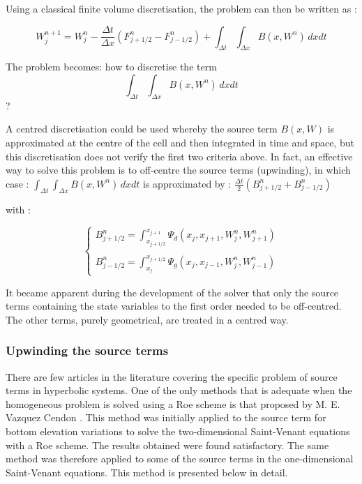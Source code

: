 Using a classical finite volume discretisation, the problem can then be written as :

\begin{equation}
 W_{j}^{n+1} = W_{j}^n - \frac{\Delta t}{\Delta x}(F_{j+1/2}^n - F_{j-1/2}^n) + \int_{\Delta t} \int_{\Delta x} B(x,W^n) \,dxdt
\end{equation}

The problem becomes: how to discretise the term
\begin{equation}
 \int_{\Delta t} \int_{\Delta x} B(x,W^n) \,dxdt \nonumber
\end{equation}
?

A centred discretisation could be used whereby the source term $B(x,W)$ is approximated at the centre of the cell and then integrated in time and space, but this discretisation does not verify the first two criteria above. In fact, an effective way to solve this problem is to off-centre the source terms (upwinding), in which case :
$\int_{\Delta t} \int_{\Delta x} B(x,W^n) \,dxdt$ is approximated by : $\frac{\Delta t}{2}(B_{j+1/2}^n + B_{j-1/2}^n)$

with :

\begin{equation}
 \left \lbrace
  \begin{array}{l}
    B_{j+1/2}^n = \int_{x_{j+1/2}}^{x_{j+1}} \Psi_d (x_j , x_{j+1} , W_{j}^n , W_{j+1}^n ) \\
    \\
    B_{j-1/2}^n = \int_{x_{j}}^{x_{j+1/2}} \Psi_g (x_j , x_{j-1} , W_{j}^n , W_{j-1}^n )
  \end{array}
 \right.
\end{equation}

It became apparent during the development of the solver that only the source terms containing the state variables to the first order needed to be off-centred. The other terms, purely geometrical, are treated in a centred way.

\subsubsection{Upwinding the source terms} \label{DecenSRC}

There are few articles in the literature covering the specific problem of source terms in hyperbolic systems. One of the only methods that is adequate when the homogeneous problem is solved using a Roe scheme is that proposed by M. E. Vazquez Cendon \cite{VAZQUEZ94}. This method was initially applied to the source term for bottom elevation variations to solve the two-dimensional Saint-Venant equations \cite{GOUTAL96} with a Roe scheme. The results obtained were found satisfactory. The same method was therefore applied to some of the source terms in the one-dimensional Saint-Venant equations. This method is presented below in detail.


